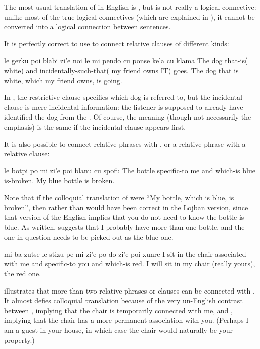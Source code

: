 The most usual translation of  in English is ,
    but  is not really a logical connective: unlike most of
    the true logical connectives (which are explained in ), it cannot be converted into
    a logical connection between sentences. 

It is perfectly correct to use  to connect relative
    clauses of different kinds:
\begin{example}
le gerku poi blabi zi'e noi\n
\T	le mi pendo cu ponse ke'a cu klama\n
The dog that-is( white) and incidentally-such-that(\n
\T	my friend owns IT) goes.\n
The dog that is white, which my friend owns,\n
\T	is going.
\end{example}

In , the restrictive clause
     specifies which dog is referred to, but the
    incidental clause  is mere
    incidental information: the listener is supposed to already
    have identified the dog from the . Of course, the
    meaning (though not necessarily the emphasis) is the same if
    the incidental clause appears first.

It is also possible to connect relative phrases with
    , or a relative phrase with a relative clause:
\begin{example}
le botpi po mi zi'e poi blanu cu spofu\n
The bottle specific-to me and which-is blue is-broken.\n
My blue bottle is broken.
\end{example}

Note that if the colloquial translation of  were ``My bottle, which is blue,
    is broken'', then  rather than  would have been
    correct in the Lojban version, since that version of the
    English implies that you do not need to know the bottle is
    blue. As written,  suggests that
    I probably have more than one bottle, and the one in question
    needs to be picked out as the blue one.
\begin{example}
mi ba zutse le stizu pe mi\n
\T	zi'e po do zi'e poi xunre\n
I  sit-in the chair associated-with me and\n
\T	specific-to you and which-is red.\n
I will sit in my chair (really yours), the red one.
\end{example}

 illustrates that more than two
    relative phrases or clauses can be connected with . It
    almost defies colloquial translation because of the very
    un-English contrast between , implying that the chair
    is temporarily connected with me, and , implying that
    the chair has a more permanent association with you. (Perhaps I
    am a guest in your house, in which case the chair would
    naturally be your property.) 

